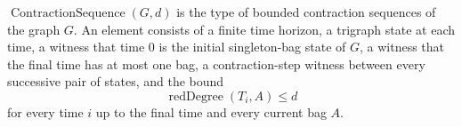\(\operatorname{ContractionSequence}(G,d)\) is the type of bounded contraction
sequences of the graph \(G\).  An element consists of a finite time horizon,
a trigraph state at each time, a witness that time \(0\) is the initial
singleton-bag state of \(G\), a witness that the final time has at most one bag,
a contraction-step witness between every successive pair of states, and the
bound
\[
  \operatorname{redDegree}(T_i,A)\le d
\]
for every time \(i\) up to the final time and every current bag \(A\).
